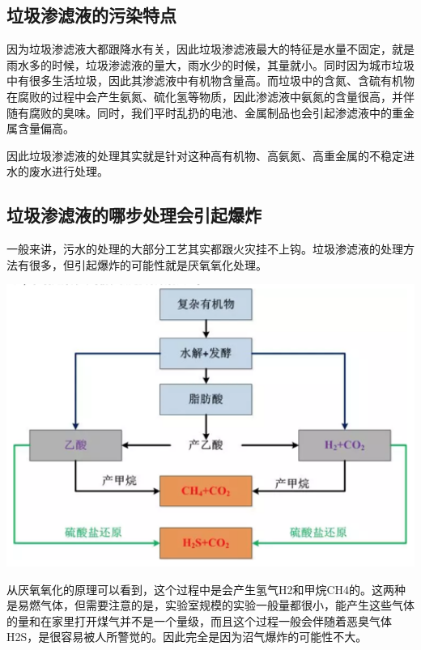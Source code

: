 \documentclass[
]{book}
\begin{document}
\hypertarget{ux5783ux573eux6e17ux6ee4ux6db2ux7684ux6c61ux67d3ux7279ux70b9}{%
\subsection{垃圾渗滤液的污染特点}\label{ux5783ux573eux6e17ux6ee4ux6db2ux7684ux6c61ux67d3ux7279ux70b9}}

因为垃圾渗滤液大都跟降水有关，因此垃圾渗滤液最大的特征是水量不固定，就是雨水多的时候，垃圾渗滤液的量大，雨水少的时候，其量就小。同时因为城市垃圾中有很多生活垃圾，因此其渗滤液中有机物含量高。而垃圾中的含氮、含硫有机物在腐败的过程中会产生氨氮、硫化氢等物质，因此渗滤液中氨氮的含量很高，并伴随有腐败的臭味。同时，我们平时乱扔的电池、金属制品也会引起渗滤液中的重金属含量偏高。

因此垃圾渗滤液的处理其实就是针对这种高有机物、高氨氮、高重金属的不稳定进水的废水进行处理。

\hypertarget{ux5783ux573eux6e17ux6ee4ux6db2ux7684ux54eaux6b65ux5904ux7406ux4f1aux5f15ux8d77ux7206ux70b8}{%
\subsection{垃圾渗滤液的哪步处理会引起爆炸}\label{ux5783ux573eux6e17ux6ee4ux6db2ux7684ux54eaux6b65ux5904ux7406ux4f1aux5f15ux8d77ux7206ux70b8}}

一般来讲，污水的处理的大部分工艺其实都跟火灾挂不上钩。垃圾渗滤液的处理方法有很多，但引起爆炸的可能性就是厌氧氧化处理。

\includegraphics[width=6.67in]{images/slybz3}

从厌氧氧化的原理可以看到，这个过程中是会产生氢气H2和甲烷CH4的。这两种是易燃气体，但需要注意的是，实验室规模的实验一般量都很小，能产生这些气体的量和在家里打开煤气并不是一个量级，而且这个过程一般会伴随着恶臭气体H2S，是很容易被人所警觉的。因此完全是因为沼气爆炸的可能性不大。
\end{document}
